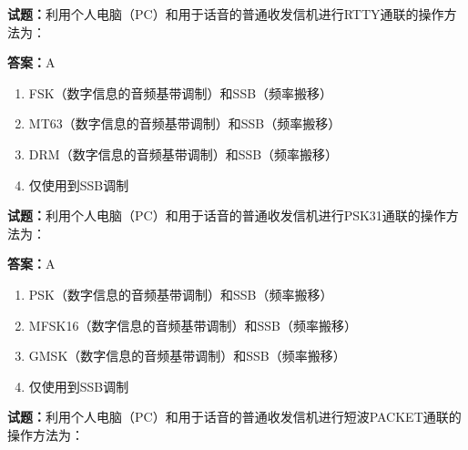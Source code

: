 \documentclass{ctexbook}
\begin{document}




\vspace{1em}

\textbf{试题：}利用个人电脑（PC）和用于话音的普通收发信机进行RTTY通联的操作方法为： 

\textbf{答案：}A 

\begin{enumerate}[leftmargin=3em]
  \item FSK（数字信息的音频基带调制）和SSB（频率搬移） 

  \item MT63（数字信息的音频基带调制）和SSB（频率搬移） 

  \item DRM（数字信息的音频基带调制）和SSB（频率搬移） 

  \item 仅使用到SSB调制 

\end{enumerate}





\vspace{1em}

\textbf{试题：}利用个人电脑（PC）和用于话音的普通收发信机进行PSK31通联的操作方法为： 

\textbf{答案：}A 

\begin{enumerate}[leftmargin=3em]
  \item PSK（数字信息的音频基带调制）和SSB（频率搬移） 

  \item MFSK16（数字信息的音频基带调制）和SSB（频率搬移） 

  \item GMSK（数字信息的音频基带调制）和SSB（频率搬移） 

  \item 仅使用到SSB调制 

\end{enumerate}





\vspace{1em}

\textbf{试题：}利用个人电脑（PC）和用于话音的普通收发信机进行短波PACKET通联的操作方法为： 
\end{document}
